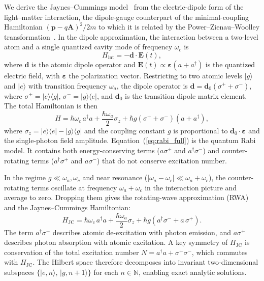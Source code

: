 \documentclass[12pt]{iopart}
\begin{document}
We derive the Jaynes--Cummings model~\cite{jaynes1963} from the electric-dipole form of the light--matter interaction, the dipole-gauge counterpart of the minimal-coupling Hamiltonian $(\boldsymbol{p} - q\boldsymbol{A})^2/2m$ to which it is related by the Power--Zienau--Woolley transformation~\cite{scully1997}. In the dipole approximation, the interaction between a two-level atom and a single quantized cavity mode of frequency $\omega_c$ is
\begin{equation}
H_{\text{int}} = -\boldsymbol{d} \cdot \boldsymbol{E}(t),
\end{equation}
where $\boldsymbol{d}$ is the atomic dipole operator and $\boldsymbol{E}(t) \propto \boldsymbol{\varepsilon}(a + a^\dagger)$ is the quantized electric field, with $\boldsymbol{\varepsilon}$ the polarization vector. Restricting to two atomic levels $|g\rangle$ and $|e\rangle$ with transition frequency $\omega_a$, the dipole operator is $\boldsymbol{d} = \boldsymbol{d}_0(\sigma^+ + \sigma^-)$, where $\sigma^+ = |e\rangle\langle g|$, $\sigma^- = |g\rangle\langle e|$, and $\boldsymbol{d}_0$ is the transition dipole matrix element. The total Hamiltonian is then
\begin{equation}
H = \hbar\omega_c\, a^\dagger a + \frac{\hbar\omega_a}{2}\sigma_z + \hbar g(\sigma^+ + \sigma^-)(a + a^\dagger),
\label{eq:rabi_full}
\end{equation}
where $\sigma_z = |e\rangle\langle e| - |g\rangle\langle g|$ and the coupling constant $g$ is proportional to $\boldsymbol{d}_0 \cdot \boldsymbol{\varepsilon}$ and the single-photon field amplitude. Equation~(\ref{eq:rabi_full}) is the quantum Rabi model. It contains both energy-conserving terms ($a\sigma^+$ and $a^\dagger\sigma^-$) and counter-rotating terms ($a^\dagger\sigma^+$ and $a\sigma^-$) that do not conserve excitation number.

In the regime $g \ll \omega_a, \omega_c$ and near resonance ($|\omega_a - \omega_c| \ll \omega_a + \omega_c$), the counter-rotating terms oscillate at frequency $\omega_a + \omega_c$ in the interaction picture and average to zero. Dropping them gives the rotating-wave approximation (RWA) and the Jaynes--Cummings Hamiltonian:
\begin{equation}
H_{\text{JC}} = \hbar\omega_c\, a^\dagger a + \frac{\hbar\omega_a}{2}\sigma_z + \hbar g\left(a^\dagger \sigma^- + a\,\sigma^+\right).
\label{eq:HJC}
\end{equation}
The term $a^\dagger\sigma^-$ describes atomic de-excitation with photon emission, and $a\sigma^+$ describes photon absorption with atomic excitation. A key symmetry of $H_{\text{JC}}$ is conservation of the total excitation number $N = a^\dagger a + \sigma^+\sigma^-$, which commutes with $H_{\text{JC}}$. The Hilbert space therefore decomposes into invariant two-dimensional subspaces $\{|e, n\rangle,\, |g, n{+}1\rangle\}$ for each $n \in \mathbb{N}$, enabling exact analytic solutions.
\end{document}
